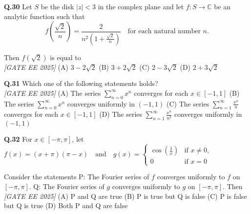 \documentclass[11pt]{article}
\begin{document}
\begin{flushleft}
\vspace{5pt}
\textbf{Q.30} Let $S$ be the disk $|z| < 3$ in the complex plane and let $f : S \rightarrow \mathbb{C}$ be an analytic function such that
\[
f\left(\frac{\sqrt{2}}{n}\right) = \frac{2}{n^2 \left(1 + \frac{\sqrt{2}}{n}\right)} \quad \text{for each natural number } n.
\]

Then $f(\sqrt{2})$ is equal to
\\[1ex] \textit{[GATE EE 2025]}
\newline
(A) $3 - 2\sqrt{2}$ \hspace{12pt}
(B) $3 + 2\sqrt{2}$ \hspace{12pt}
(C) $2 - 3\sqrt{2}$ \hspace{12pt}
(D) $2 + 3\sqrt{2}$ \newline

\vspace{5pt}
\textbf{Q.31} Which one of the following statements holds? 
\\[1ex] \textit{[GATE EE 2025]}
\newline
(A) The series $\sum_{n=0}^{\infty} x^n$ converges for each $x \in [-1, 1]$ \newline
(B) The series $\sum_{n=0}^{\infty} x^n$ converges uniformly in $(-1, 1)$ \newline
(C) The series $\sum_{n=1}^{\infty} \frac{x^n}{n}$ converges for each $x \in [-1, 1]$ \newline
(D) The series $\sum_{n=1}^{\infty} \frac{x^n}{n^2}$ converges uniformly in $(-1, 1)$ \newline
\end{flushleft}

\begin{flushleft}
\textbf{Q.32} For $x \in [-\pi, \pi]$, let \newline
$f(x) = (x + \pi)(\pi - x) \quad \text{and} \quad g(x) = \begin{cases}
\cos\left(\frac{1}{x}\right) & \text{if } x \neq 0, \\
0 & \text{if } x = 0
\end{cases}$ \newline

Consider the statements \newline
P: The Fourier series of $f$ converges uniformly to $f$ on $[-\pi, \pi]$. \newline
Q: The Fourier series of $g$ converges uniformly to $g$ on $[-\pi, \pi]$. \newline
Then
\\[1ex] \textit{[GATE EE 2025]}
\newline
(A) P and Q are true \hspace{2em} (B) P is true but Q is false \newline
(C) P is false but Q is true \hspace{2em} (D) Both P and Q are false \newline
\end{flushleft}
\end{document}
